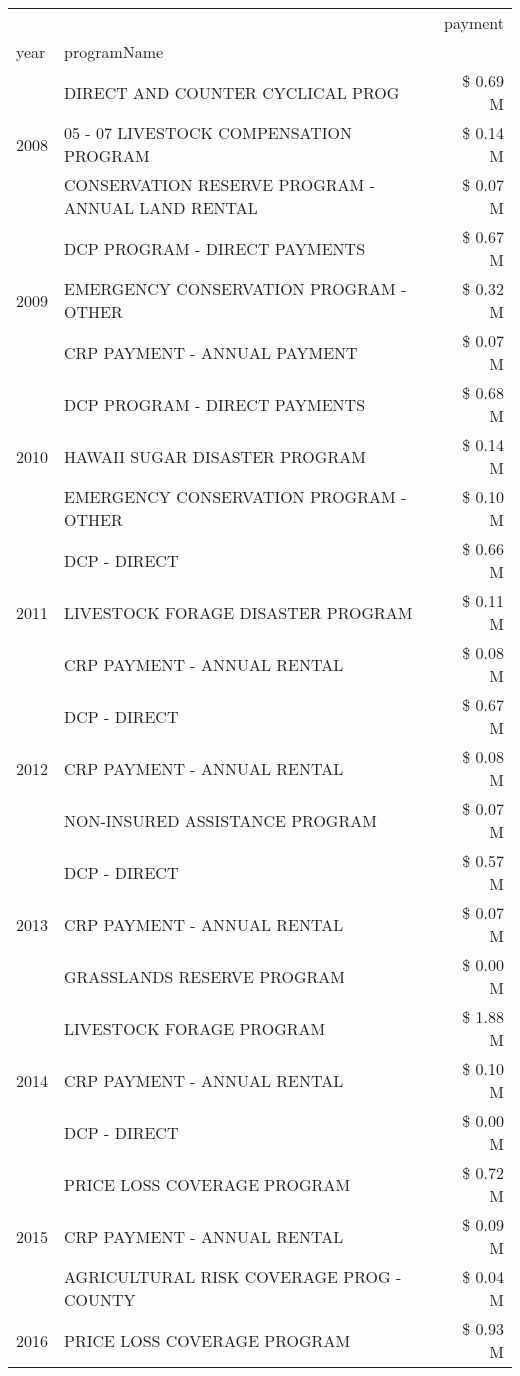 \begin{tabular}{llr}
\toprule
 &  & payment \\
year & programName &  \\
\midrule
\multirow[t]{3}{*}{2008} & DIRECT AND COUNTER CYCLICAL PROG & \$ 0.69 M \\
 & 05 - 07 LIVESTOCK COMPENSATION PROGRAM & \$ 0.14 M \\
 & CONSERVATION RESERVE PROGRAM - ANNUAL LAND RENTAL & \$ 0.07 M \\
\cline{1-3}
\multirow[t]{3}{*}{2009} & DCP PROGRAM - DIRECT PAYMENTS & \$ 0.67 M \\
 & EMERGENCY CONSERVATION PROGRAM - OTHER & \$ 0.32 M \\
 & CRP PAYMENT - ANNUAL PAYMENT & \$ 0.07 M \\
\cline{1-3}
\multirow[t]{3}{*}{2010} & DCP PROGRAM - DIRECT PAYMENTS & \$ 0.68 M \\
 & HAWAII SUGAR DISASTER PROGRAM & \$ 0.14 M \\
 & EMERGENCY CONSERVATION PROGRAM - OTHER & \$ 0.10 M \\
\cline{1-3}
\multirow[t]{3}{*}{2011} & DCP - DIRECT & \$ 0.66 M \\
 & LIVESTOCK FORAGE DISASTER PROGRAM & \$ 0.11 M \\
 & CRP PAYMENT - ANNUAL RENTAL & \$ 0.08 M \\
\cline{1-3}
\multirow[t]{3}{*}{2012} & DCP - DIRECT & \$ 0.67 M \\
 & CRP PAYMENT - ANNUAL RENTAL & \$ 0.08 M \\
 & NON-INSURED ASSISTANCE PROGRAM & \$ 0.07 M \\
\cline{1-3}
\multirow[t]{3}{*}{2013} & DCP - DIRECT & \$ 0.57 M \\
 & CRP PAYMENT - ANNUAL RENTAL & \$ 0.07 M \\
 & GRASSLANDS RESERVE PROGRAM & \$ 0.00 M \\
\cline{1-3}
\multirow[t]{3}{*}{2014} & LIVESTOCK FORAGE PROGRAM & \$ 1.88 M \\
 & CRP PAYMENT - ANNUAL RENTAL & \$ 0.10 M \\
 & DCP - DIRECT & \$ 0.00 M \\
\cline{1-3}
\multirow[t]{3}{*}{2015} & PRICE LOSS COVERAGE PROGRAM & \$ 0.72 M \\
 & CRP PAYMENT - ANNUAL RENTAL & \$ 0.09 M \\
 & AGRICULTURAL RISK COVERAGE PROG - COUNTY & \$ 0.04 M \\
\cline{1-3}
\multirow[t]{3}{*}{2016} & PRICE LOSS COVERAGE PROGRAM & \$ 0.93 M \\

\end{tabular}
